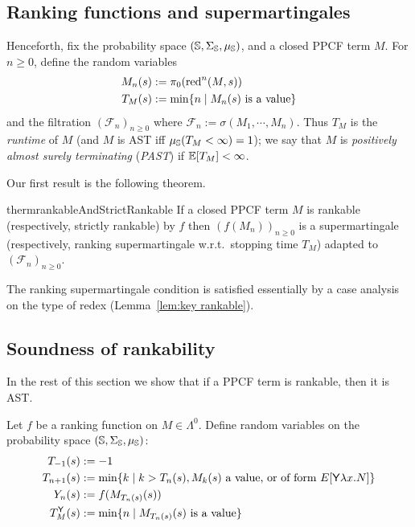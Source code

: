 \subsection{Ranking functions and supermartingales}

Henceforth, fix the probability space $({\mathbb{S}}, \Sigma_{\mathbb{S}}, \mu_{{\mathbb{S}}})$, and a closed PPCF term $M$.
For $n \geq 0$, define the random variables 
\begin{align*}
M_n(s) &:= \pi_0 (\operatorname{red}^n(M, s))\\
T_M(s) &:= \min \{n \mid \hbox{$M_n(s)$ is a value}\}
\end{align*} 
and the filtration $(\mathcal{F}_n)_{n \geq 0}$ where $\mathcal{F}_n := \sigma(M_1, \cdots, M_n)$.
Thus $T_M$ is the \emph{runtime} of $M$ (and $M$ is AST iff $\mu_{{\mathbb{S}}}(T_M < \infty) = 1$); we say that $M$ is \emph{positively almost surely terminating} (\emph{PAST}) if $\mathbb{E}[T_M] < \infty$.

Our first result is the following theorem.
\begin{restatable}{therm}{rankableAndStrictRankable}
\label{thm:rankable and strict rankable}
If a closed PPCF term $M$ is rankable (respectively, strictly rankable) by $f$ 
then $(f(M_n))_{n \geq 0}$ is a supermartingale (respectively, ranking supermartingale w.r.t.~stopping time $T_M$) adapted to $(\mathcal{F}_n)_{n \geq 0}$. %
\end{restatable}

The ranking supermartingale condition is satisfied essentially by a case analysis on the type of redex (Lemma~\ref{lem:key rankable}).

\subsection{Soundness of rankability}

In the rest of this section we show that if a PPCF term is rankable, then it is AST. 

Let $f$ be a ranking function on $M \in \Lambda^0$.
Define random variables on the probability space $({\mathbb{S}}, \Sigma_{\mathbb{S}}, \mu_{{\mathbb{S}}})$:
\begin{align}
T_{-1}(s) & := -1 \nonumber \\
T_{n+1}(s) & := \min \{ k \mid k>T_n(s), M_k(s) \textrm{ a value, or of form } E[\tY \lambda x. N] \} \nonumber \\
Y_n(s) & := f(M_{T_n(s)}(s)) \nonumber \\
T_M^\tY(s) &:= \min \set{n \mid M_{T_n(s)}(s) \textrm{ is a value}} \label{eq:y stopping time} 
\end{align}

